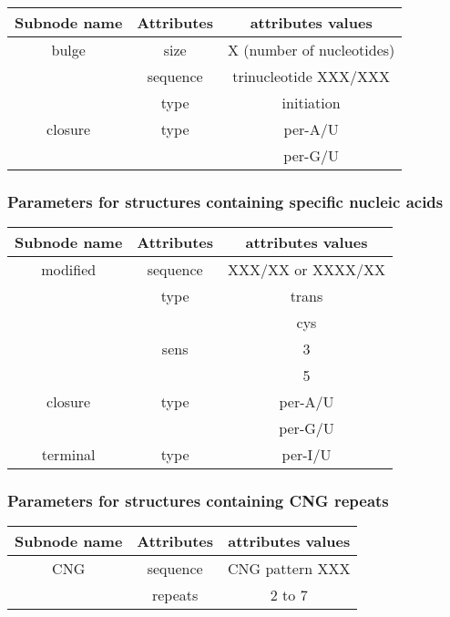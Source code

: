 \documentclass{article}
\begin{document}
\begin{table}[h]
\begin{tabular}[h]{| c | c | c |}
\textbf{Subnode name} & \textbf{Attributes} & \textbf{attributes values} \\
 \hline
bulge & size & X (number of nucleotides) \\
 & sequence & trinucleotide XXX/XXX \\
 & type & initiation \\
  \hline
closure & type & per-A/U \\
 & & per-G/U \\
  \hline
\end{tabular}
\end{table}

\subsubsection{Parameters for structures containing specific nucleic acids}

\begin{table}[h]
\begin{tabular}[h]{| c | c | c |}
\textbf{Subnode name} & \textbf{Attributes} & \textbf{attributes values} \\
 \hline
modified & sequence & XXX/XX or XXXX/XX \\
 & type & trans \\
 & & cys \\
 & sens & 3 \\
 & & 5 \\
  \hline
closure & type & per-A/U \\
 & & per-G/U \\
  \hline
terminal & type & per-I/U \\
 \hline
\end{tabular} 
\end{table}

\subsubsection{Parameters for structures containing CNG repeats}

\begin{table}[h]
\begin{tabular}[h]{| c | c | c |}
\textbf{Subnode name} & \textbf{Attributes} & \textbf{attributes values} \\
 \hline
CNG & sequence & CNG pattern XXX \\
 & repeats & 2 to 7 \\
  \hline
\end{tabular}
\end{table}
\end{document}
